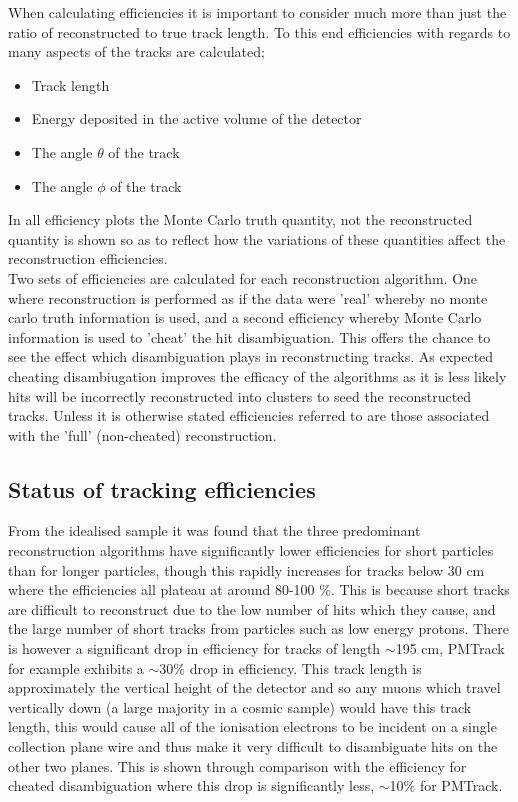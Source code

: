 \documentclass[11pt]{report} %
\begin{document}
{When calculating efficiencies it is important to consider much more than just the ratio of reconstructed to true track length. To this end efficiencies with regards to many aspects of the tracks are calculated;
\begin{itemize}
\item Track length
\item Energy deposited in the active volume of the detector
\item The angle $\theta$ of the track
\item The angle $\phi$ of the track
\end{itemize}
In all efficiency plots the Monte Carlo truth quantity, not the reconstructed quantity is shown so as to reflect how the variations of these quantities affect the reconstruction efficiencies. \\

Two sets of efficiencies are calculated for each reconstruction algorithm. One where reconstruction is performed as if the data were 'real' whereby no monte carlo truth information is used, and a second efficiency whereby Monte Carlo information is used to 'cheat' the hit disambiguation. This offers the chance to see the effect which disambiguation plays in reconstructing tracks. As expected cheating disambiugation improves the efficacy of the algorithms as it is less likely hits will be incorrectly reconstructed into clusters to seed the reconstructed tracks. Unless it is otherwise stated efficiencies referred to are those associated with the 'full' (non-cheated) reconstruction. 

\subsection{Status of tracking efficiencies}
From the idealised sample it was found that the three predominant reconstruction algorithms have significantly lower efficiencies for short particles than for longer particles, though this rapidly increases for tracks below 30 cm where the efficiencies all plateau at around 80-100 \%. This is because short tracks are difficult to reconstruct due to the low number of hits which they cause, and the large number of short tracks from particles such as low energy protons. There is however a significant drop in efficiency for tracks of length $\sim$195 cm, PMTrack for example exhibits a $\sim$30$\%$ drop in efficiency. This track length is approximately the vertical height of the detector and so any muons which travel vertically down (a large majority in a cosmic sample) would have this track length, this would cause all of the ionisation electrons to be incident on a single collection plane wire and thus make it very difficult to disambiguate hits on the other two planes. This is shown through comparison with the efficiency for cheated disambiguation where this drop is significantly less, $\sim$10$\%$ for PMTrack. \\

}
\end{document}
